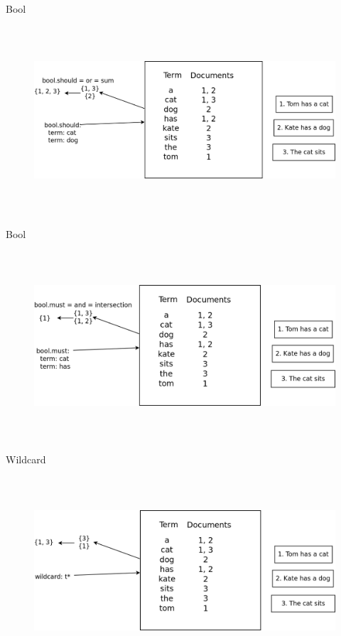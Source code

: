 \documentclass{beamer}
\begin{document}
\begin{frame}{Bool}
	\begin{figure}
		\includegraphics[width=\textwidth,height=7cm,keepaspectratio=true]{bool-query}
	\end{figure}
\end{frame}
\begin{frame}{Bool}
	\begin{figure}
		\includegraphics[width=\textwidth,height=7cm,keepaspectratio=true]{bool-must}
	\end{figure}
\end{frame}
\begin{frame}{Wildcard}
	\begin{figure}
		\includegraphics[width=\textwidth,height=7cm,keepaspectratio=true]{wildcard-prefix}
	\end{figure}
\end{frame}
\end{document}
